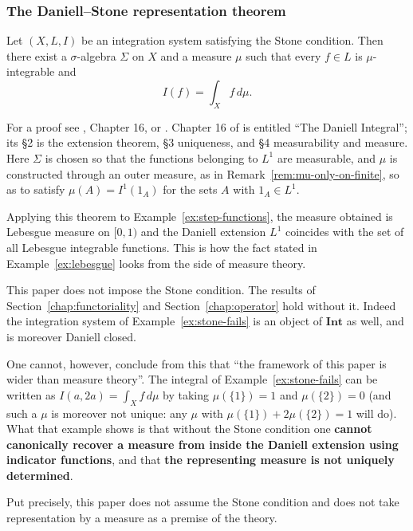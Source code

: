 \subsubsection{The Daniell--Stone representation theorem}

\begin{theorem}\label{thm:daniell-stone}
  Let $(X,L,I)$ be an integration system satisfying the Stone condition.
  Then there exist a $\sigma$-algebra $\Sigma$ on $X$ and a measure $\mu$ such
  that every $f\in L$ is $\mu$-integrable and
  \[
    I(f)=\int_Xf\,d\mu .
  \]
\end{theorem}

\noindent
For a proof see \cite{Stone}, \cite{Royden} Chapter 16, or \cite{CFW}.
Chapter 16 of \cite{Royden} is entitled ``The Daniell Integral''; its \S2 is the
extension theorem, \S3 uniqueness, and \S4 measurability and measure.
Here $\Sigma$ is chosen so that the functions belonging to $L^1$ are measurable,
and $\mu$ is constructed through an outer measure, as in
Remark~\ref{rem:mu-only-on-finite}, so as to satisfy $\mu(A)=I^1(1_A)$ for the
sets $A$ with $1_A\in L^1$.

\begin{example}
  Applying this theorem to Example~\ref{ex:step-functions}, the measure obtained
  is Lebesgue measure on $[0,1)$ and the Daniell extension $L^1$ coincides with
  the set of all Lebesgue integrable functions.
  This is how the fact stated in Example~\ref{ex:lebesgue} looks from the side
  of measure theory.
\end{example}

\begin{remark}
  This paper does not impose the Stone condition.
  The results of Section~\ref{chap:functoriality} and
  Section~\ref{chap:operator} hold without it.
  Indeed the integration system of Example~\ref{ex:stone-fails} is an object of
  $\mathbf{Int}$ as well, and is moreover Daniell closed.

  One cannot, however, conclude from this that ``the framework of this paper is
  wider than measure theory''.
  The integral of Example~\ref{ex:stone-fails} can be written as
  $I(a,2a)=\int_Xf\,d\mu$ by taking $\mu(\{1\})=1$ and $\mu(\{2\})=0$
  (and such a $\mu$ is moreover not unique: any $\mu$ with
  $\mu(\{1\})+2\mu(\{2\})=1$ will do).
  What that example shows is that without the Stone condition one
  \textbf{cannot canonically recover a measure from inside the Daniell extension
  using indicator functions}, and that \textbf{the representing measure is not
  uniquely determined}.

  Put precisely, this paper does not assume the Stone condition and does not take
  representation by a measure as a premise of the theory.
\end{remark}

